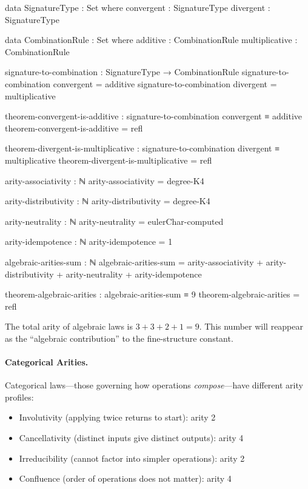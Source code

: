 \documentclass[11pt,a4paper]{book}
\begin{document}
\begin{code}
data SignatureType : Set where
  convergent : SignatureType
  divergent  : SignatureType

data CombinationRule : Set where
  additive       : CombinationRule
  multiplicative : CombinationRule

signature-to-combination : SignatureType → CombinationRule
signature-to-combination convergent = additive
signature-to-combination divergent  = multiplicative

theorem-convergent-is-additive : signature-to-combination convergent ≡ additive
theorem-convergent-is-additive = refl

theorem-divergent-is-multiplicative : signature-to-combination divergent ≡ multiplicative
theorem-divergent-is-multiplicative = refl

arity-associativity : ℕ
arity-associativity = degree-K4

arity-distributivity : ℕ
arity-distributivity = degree-K4

arity-neutrality : ℕ
arity-neutrality = eulerChar-computed

arity-idempotence : ℕ
arity-idempotence = 1

algebraic-arities-sum : ℕ
algebraic-arities-sum = arity-associativity + arity-distributivity 
                      + arity-neutrality + arity-idempotence

theorem-algebraic-arities : algebraic-arities-sum ≡ 9
theorem-algebraic-arities = refl
\end{code}

The total arity of algebraic laws is $3 + 3 + 2 + 1 = 9$. This number will reappear as 
the ``algebraic contribution'' to the fine-structure constant.

\paragraph{Categorical Arities.}
Categorical laws---those governing how operations \emph{compose}---have different arity profiles:
\begin{itemize}
\item Involutivity (applying twice returns to start): arity 2
\item Cancellativity (distinct inputs give distinct outputs): arity 4
\item Irreducibility (cannot factor into simpler operations): arity 2
\item Confluence (order of operations does not matter): arity 4
\end{itemize}
\end{document}

